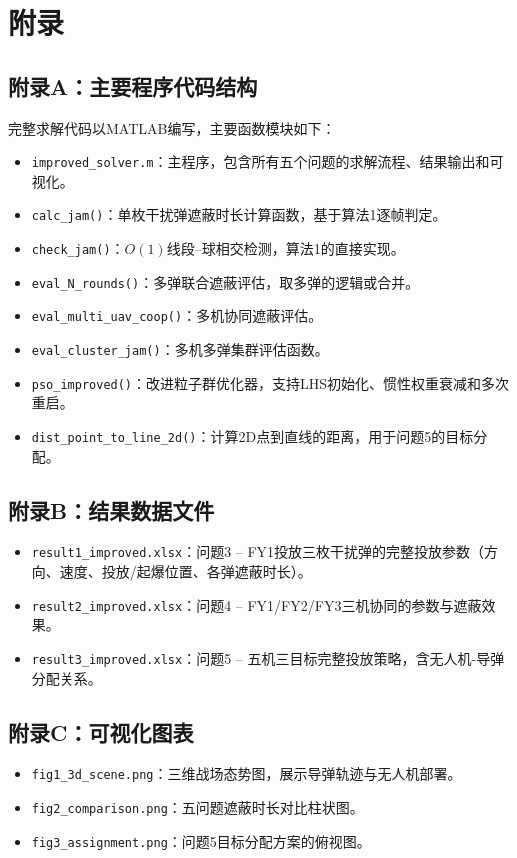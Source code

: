 \documentclass[12pt,a4paper]{ctexart}
\begin{document}
\section*{附录}

\subsection*{附录A：主要程序代码结构}

完整求解代码以MATLAB编写，主要函数模块如下：

\begin{itemize}
    \item \texttt{improved\_solver.m}：主程序，包含所有五个问题的求解流程、结果输出和可视化。
    \item \texttt{calc\_jam()}：单枚干扰弹遮蔽时长计算函数，基于算法1逐帧判定。
    \item \texttt{check\_jam()}：$O(1)$线段--球相交检测，算法1的直接实现。
    \item \texttt{eval\_N\_rounds()}：多弹联合遮蔽评估，取多弹的逻辑或合并。
    \item \texttt{eval\_multi\_uav\_coop()}：多机协同遮蔽评估。
    \item \texttt{eval\_cluster\_jam()}：多机多弹集群评估函数。
    \item \texttt{pso\_improved()}：改进粒子群优化器，支持LHS初始化、惯性权重衰减和多次重启。
    \item \texttt{dist\_point\_to\_line\_2d()}：计算2D点到直线的距离，用于问题5的目标分配。
\end{itemize}

\subsection*{附录B：结果数据文件}

\begin{itemize}
    \item \texttt{result1\_improved.xlsx}：问题3 -- FY1投放三枚干扰弹的完整投放参数（方向、速度、投放/起爆位置、各弹遮蔽时长）。
    \item \texttt{result2\_improved.xlsx}：问题4 -- FY1/FY2/FY3三机协同的参数与遮蔽效果。
    \item \texttt{result3\_improved.xlsx}：问题5 -- 五机三目标完整投放策略，含无人机-导弹分配关系。
\end{itemize}

\subsection*{附录C：可视化图表}

\begin{itemize}
    \item \texttt{fig1\_3d\_scene.png}：三维战场态势图，展示导弹轨迹与无人机部署。
    \item \texttt{fig2\_comparison.png}：五问题遮蔽时长对比柱状图。
    \item \texttt{fig3\_assignment.png}：问题5目标分配方案的俯视图。
\end{itemize}
\end{document}
